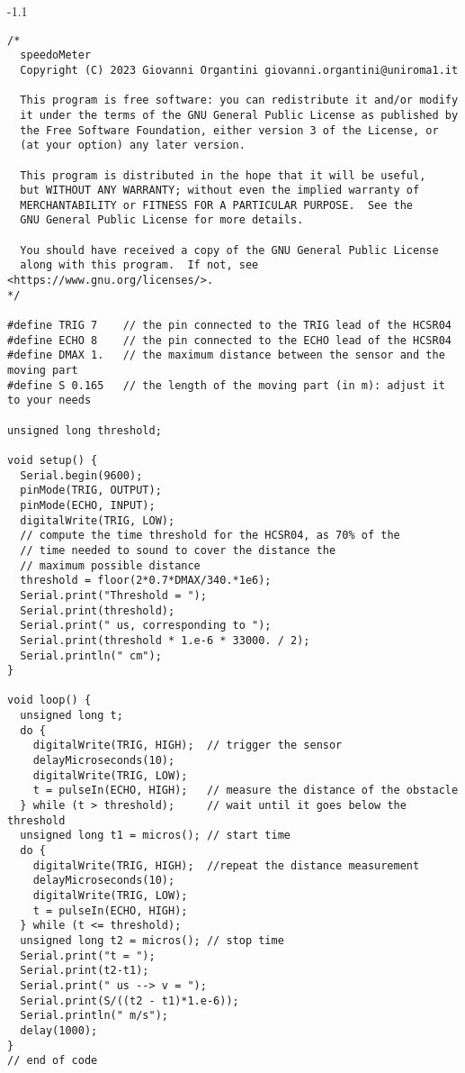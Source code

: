 \documentclass{extra}
\begin{document}
\vfill\par\eject
{}
\begin{adjmulticols}{1}{0pt}{-1.1\marginparwidth}
\begin{lstlisting}[basicstyle=\footnotesize, showspaces=false]
/*
  speedoMeter  
  Copyright (C) 2023 Giovanni Organtini giovanni.organtini@uniroma1.it

  This program is free software: you can redistribute it and/or modify
  it under the terms of the GNU General Public License as published by
  the Free Software Foundation, either version 3 of the License, or
  (at your option) any later version.

  This program is distributed in the hope that it will be useful,
  but WITHOUT ANY WARRANTY; without even the implied warranty of
  MERCHANTABILITY or FITNESS FOR A PARTICULAR PURPOSE.  See the
  GNU General Public License for more details.

  You should have received a copy of the GNU General Public License
  along with this program.  If not, see <https://www.gnu.org/licenses/>.
*/

#define TRIG 7    // the pin connected to the TRIG lead of the HCSR04 
#define ECHO 8    // the pin connected to the ECHO lead of the HCSR04
#define DMAX 1.   // the maximum distance between the sensor and the moving part
#define S 0.165   // the length of the moving part (in m): adjust it to your needs

unsigned long threshold;

void setup() {
  Serial.begin(9600);
  pinMode(TRIG, OUTPUT);
  pinMode(ECHO, INPUT);
  digitalWrite(TRIG, LOW);
  // compute the time threshold for the HCSR04, as 70% of the
  // time needed to sound to cover the distance the 
  // maximum possible distance    
  threshold = floor(2*0.7*DMAX/340.*1e6);
  Serial.print("Threshold = ");
  Serial.print(threshold);
  Serial.print(" us, corresponding to ");
  Serial.print(threshold * 1.e-6 * 33000. / 2);
  Serial.println(" cm");
}

void loop() {
  unsigned long t;
  do {    
    digitalWrite(TRIG, HIGH);  // trigger the sensor
    delayMicroseconds(10);
    digitalWrite(TRIG, LOW);
    t = pulseIn(ECHO, HIGH);   // measure the distance of the obstacle
  } while (t > threshold);     // wait until it goes below the threshold
  unsigned long t1 = micros(); // start time
  do {    
    digitalWrite(TRIG, HIGH);  //repeat the distance measurement
    delayMicroseconds(10);
    digitalWrite(TRIG, LOW);
    t = pulseIn(ECHO, HIGH);
  } while (t <= threshold);
  unsigned long t2 = micros(); // stop time
  Serial.print("t = "); 
  Serial.print(t2-t1);
  Serial.print(" us --> v = ");
  Serial.print(S/((t2 - t1)*1.e-6));
  Serial.println(" m/s");
  delay(1000);
}
// end of code
\end{lstlisting}
\end{adjmulticols}
\end{document}
